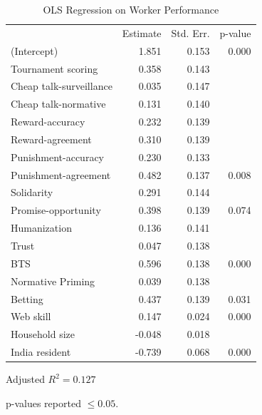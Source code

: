 \documentclass{chi2009}
\begin{document}
\begin{table}[ht]					%
\begin{center}						%
\caption{OLS Regression on Worker Performance} %
\vspace{8pt}
\begin{threeparttable}
\begin{tabular}{@{}l r  r r@{}}
\toprule
 & Estimate & Std. Err. & p-value\tnote{\dag}\\
\cmidrule(l){2-4}
(Intercept) & 1.851 & 0.153 & 0.000\\
Tournament scoring & 0.358 & 0.143 &\\
Cheap talk-surveillance & 0.035 & 0.147 &\\
Cheap talk-normative & 0.131 & 0.140 &\\
Reward-accuracy & 0.232 & 0.139 &\\
Reward-agreement & 0.310 & 0.139 &\\
Punishment-accuracy & 0.230 & 0.133 &\\
Punishment-agreement & 0.482 & 0.137 & 0.008\\
Solidarity & 0.291 & 0.144 &\\
Promise-opportunity & 0.398 & 0.139 & 0.074\\
Humanization & 0.136 & 0.141 &\\
Trust & 0.047 & 0.138 &\\
BTS & 0.596 & 0.138 & 0.000\\
Normative Priming & 0.039 & 0.138 &\\
Betting & 0.437 & 0.139 & 0.031\\
Web skill & 0.147 & 0.024 & 0.000\\
Household size  & -0.048 & 0.018 &\\
India resident & -0.739 & 0.068 & 0.000\\
\bottomrule
\end{tabular}
  \begin{tablenotes}[para]
	\item Adjusted $R^{2} = 0.127$\\
	\item[\dag]p-values reported $\leq 0.05$.\\
  \end{tablenotes}
\end{threeparttable}
\label{table:demog_control_model}
\end{center}
\end{table}
\end{document}
